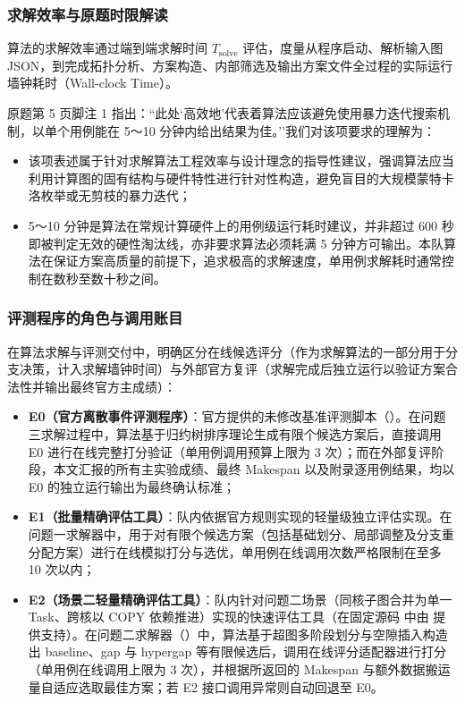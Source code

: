 \documentclass[anonymous,withtoc]{gmcm2026}
\providecommand{\tightlist}{\setlength{\itemsep}{0pt}\setlength{\parskip}{0pt}}
\begin{document}
\subsubsection{求解效率与原题时限解读}

算法的求解效率通过端到端求解时间 \(T_{\text{solve}}\) 评估，度量从程序启动、解析输入图 JSON，到完成拓扑分析、方案构造、内部筛选及输出方案文件全过程的实际运行墙钟耗时（Wall-clock Time）。

原题第 5 页脚注 1 指出：``此处`高效地'代表着算法应该避免使用暴力迭代搜索机制，以单个用例能在 5～10 分钟内给出结果为佳。''我们对该项要求的理解为：

\begin{itemize}
\tightlist
\item
  该项表述属于针对求解算法工程效率与设计理念的指导性建议，强调算法应当利用计算图的固有结构与硬件特性进行针对性构造，避免盲目的大规模蒙特卡洛枚举或无剪枝的暴力迭代；
\item
  5～10 分钟是算法在常规计算硬件上的用例级运行耗时建议，并非超过 600 秒即被判定无效的硬性淘汰线，亦非要求算法必须耗满 5 分钟方可输出。本队算法在保证方案高质量的前提下，追求极高的求解速度，单用例求解耗时通常控制在数秒至数十秒之间。
\end{itemize}

\subsubsection{评测程序的角色与调用账目}

在算法求解与评测交付中，明确区分在线候选评分（作为求解算法的一部分用于分支决策，计入求解墙钟时间）与外部官方复评（求解完成后独立运行以验证方案合法性并输出最终官方主成绩）：

\begin{itemize}
\tightlist
\item
  \textbf{E0（官方离散事件评测程序）}：官方提供的未修改基准评测脚本（\texttt{}）。在问题三求解过程中，算法基于归约树排序理论生成有限个候选方案后，直接调用 E0 进行在线完整打分验证（单用例调用预算上限为 3 次）；而在外部复评阶段，本文汇报的所有主实验成绩、最终 Makespan 以及附录逐用例结果，均以 E0 的独立运行输出为最终确认标准；
\item
  \textbf{E1（批量精确评估工具）}：队内依据官方规则实现的轻量级独立评估实现。在问题一求解器中，用于对有限个候选方案（包括基础划分、局部调整及分支重分配方案）进行在线模拟打分与选优，单用例在线调用次数严格限制在至多 10 次以内；
\item
  \textbf{E2（场景二轻量精确评估工具）}：队内针对问题二场景（同核子图合并为单一 Task、跨核以 COPY 依赖推进）实现的快速评估工具（在固定源码 \texttt{} 中由 \texttt{} 提供支持）。在问题二求解器（\texttt{}）中，算法基于超图多阶段划分与空隙插入构造出 baseline、gap 与 hypergap 等有限候选后，调用在线评分适配器进行打分（单用例在线调用上限为 3 次），并根据所返回的 Makespan 与额外数据搬运量自适应选取最佳方案；若 E2 接口调用异常则自动回退至 E0。
\end{itemize}
\end{document}
